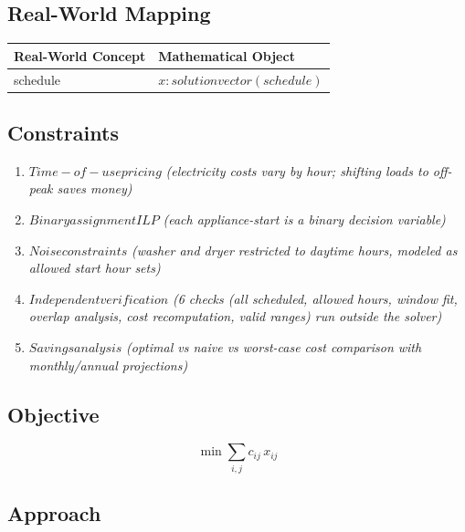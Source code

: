 \documentclass[11pt, a4paper]{article}
\begin{document}
\subsection{Real-World Mapping}

\begin{longtable}{ll}
\toprule
\textbf{Real-World Concept} & \textbf{Mathematical Object} \\
\midrule
\endhead
schedule & $x: solution vector (schedule)$ \\
\bottomrule
\end{longtable}

\subsection{Constraints}

\begin{enumerate}
  \item $Time-of-use pricing$
  \hfill \textit{(electricity costs vary by hour; shifting loads to off-peak saves money)}
  \item $Binary assignment ILP$
  \hfill \textit{(each appliance-start is a binary decision variable)}
  \item $Noise constraints$
  \hfill \textit{(washer and dryer restricted to daytime hours, modeled as allowed start hour sets)}
  \item $Independent verification$
  \hfill \textit{(6 checks (all scheduled, allowed hours, window fit, overlap analysis, cost recomputation, valid ranges) run outside the solver)}
  \item $Savings analysis$
  \hfill \textit{(optimal vs naive vs worst-case cost comparison with monthly/annual projections)}
\end{enumerate}

\subsection{Objective}

\begin{equation}
\min \sum_{i,j} c_{ij} \, x_{ij}
\end{equation}

\subsection{Approach}
\end{document}
